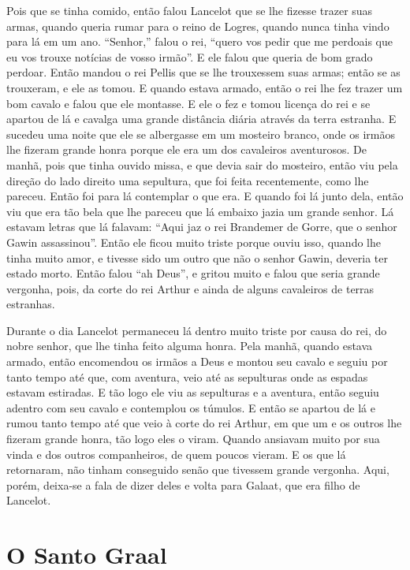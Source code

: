 Pois que se tinha comido, então falou Lancelot que se lhe fizesse trazer suas
armas, quando queria rumar para o reino de Logres, quando nunca tinha vindo
para lá em um ano. “Senhor,” falou o rei, “quero vos pedir que me perdoais que
eu vos trouxe notícias de vosso irmão”. E ele falou que queria de bom grado
perdoar. Então mandou o rei Pellis que se lhe trouxessem suas armas; então se
as trouxeram, e ele as tomou. E quando estava armado, então o rei lhe fez
trazer um bom cavalo e falou que ele montasse. E ele o fez e tomou licença do
rei e se apartou de lá e cavalga uma grande distância diária através da terra
estranha. E sucedeu uma noite que ele se albergasse em um mosteiro branco, onde
os irmãos lhe fizeram grande honra porque ele era um dos cavaleiros
aventurosos. De manhã, pois que tinha ouvido missa, e que devia sair
do mosteiro, então viu pela direção do lado direito uma sepultura, que foi
feita recentemente, como lhe pareceu. Então foi para lá contemplar o que era. E
quando foi lá junto dela, então viu que era tão bela que lhe pareceu que lá embaixo
jazia um grande senhor. Lá estavam letras que lá falavam: “Aqui jaz o
rei Brandemer de Gorre, que o senhor Gawin assassinou”. Então ele ficou muito
triste porque ouviu isso, quando lhe tinha muito amor, e tivesse sido um outro
que não o senhor Gawin, deveria ter estado morto. Então falou “ah Deus”, e
gritou muito e falou que seria grande vergonha, pois, da corte do rei Arthur e
ainda de alguns cavaleiros de terras estranhas.

 Durante o dia Lancelot permaneceu lá dentro muito triste por causa do rei, do
nobre senhor, que lhe tinha feito alguma honra. Pela manhã, quando
estava armado, então encomendou os irmãos a Deus e montou seu cavalo e seguiu
por tanto tempo até que, com aventura, veio até as sepulturas onde as espadas
estavam estiradas. E tão logo ele viu as sepulturas e a aventura, então seguiu adentro
com seu cavalo e contemplou os túmulos. E então se apartou de lá e rumou tanto
tempo até que veio à corte do rei Arthur, em que um e os outros lhe fizeram
grande honra, tão logo eles o viram. Quando ansiavam muito por sua vinda e dos
outros companheiros, de quem poucos vieram. E os que lá retornaram, não tinham
conseguido senão que tivessem grande vergonha. Aqui, porém, deixa-se a
fala de dizer deles e volta para Galaat, que era filho de Lancelot. 

\chapter{O Santo Graal}

